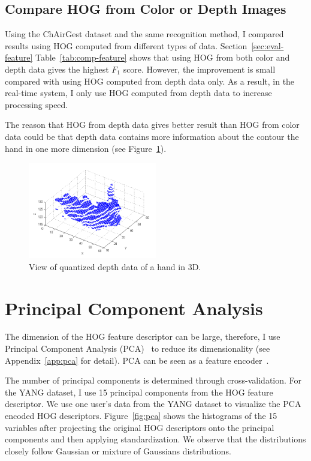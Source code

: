 \subsection{Compare HOG from Color or Depth Images}
Using the ChAirGest dataset and the same recognition method, I compared
results using HOG computed from different types of
data. Section~\ref{sec:eval-feature} Table~\ref{tab:comp-feature} shows that
using HOG from both color and depth data gives the highest $F_1$ score. However, the improvement is small
compared with using HOG computed from depth data only. As a result, in the
real-time system, I only use HOG computed from depth data to increase
processing speed.

The reason that HOG from depth data gives better result than HOG from color data
could be that depth data contains more information about the contour the hand in
one more dimension (see Figure~\ref{fig:hand-3d}).
 
\begin{figure}[tbh]
\centering
\includegraphics[width=0.5\textwidth]{figures/hand3d.png}
\caption{View of quantized depth data of a hand in 3D.}
\label{fig:hand-3d}
\end{figure}

\section{Principal Component Analysis}
The dimension of the HOG feature descriptor can be large, therefore, I use
Principal Component Analysis (PCA)~\cite{pca} to reduce its dimensionality (see
Appendix~\ref{app:pca} for detail). PCA can be seen as a feature
encoder~\cite{ranzato07}.

The number of principal components is determined through cross-validation. For
the YANG dataset, I use 15 principal components from the HOG feature descriptor.
We use one user's data from the YANG dataset to visualize the PCA
encoded HOG descriptors. Figure~\ref{fig:pca} shows the histograms of the 15
variables after projecting the original HOG descriptors onto the principal
components and then applying standardization.
We observe that the distributions closely follow Gaussian or mixture of
Gaussians distributions.

